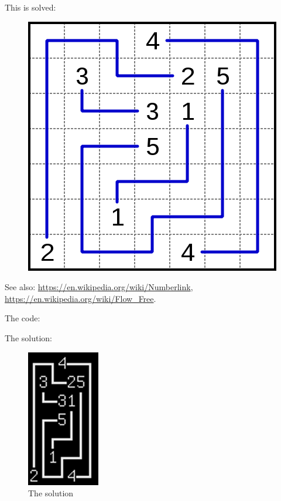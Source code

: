 This is solved:

\begin{figure}[H]
\centering
\includegraphics[scale=0.3]{puzzles/numberlink/Z3/424px-Numberlink_puzzle_solution.png}
\caption{}
\end{figure}

See also:
\url{https://en.wikipedia.org/wiki/Numberlink},
\url{https://en.wikipedia.org/wiki/Flow_Free}.

The code:



The solution:



\begin{figure}[H]
\centering
\includegraphics[scale=1]{puzzles/numberlink/Z3/solution.png}
\caption{The solution}
\end{figure}

